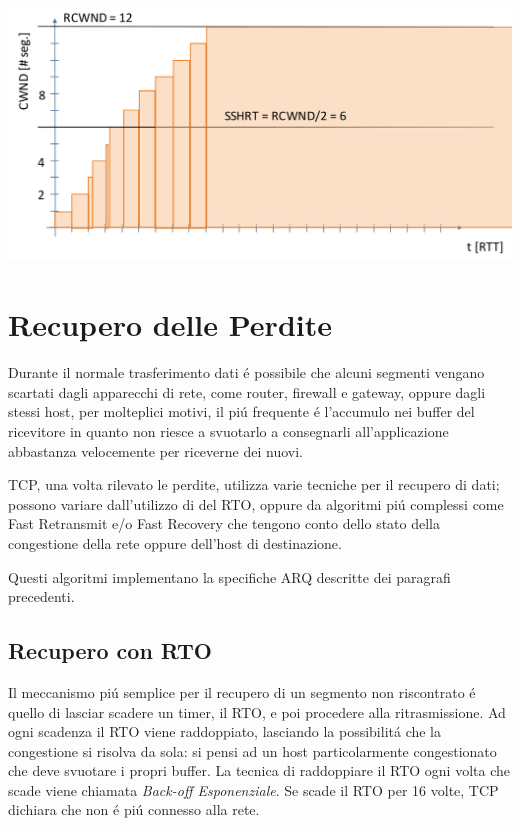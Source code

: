 \documentclass[12pt]{article}
\begin{document}
\begin{center}
	\includegraphics[scale=0.3]{livello_trasporto-img8.png}
\end{center}



\clearpage
\section{Recupero delle Perdite}\label{recupero-delle-perdite}
Durante il normale trasferimento dati \'e possibile che alcuni segmenti vengano scartati dagli apparecchi di rete, 
come router, firewall e gateway, oppure dagli stessi host, per molteplici motivi, il pi\'u frequente \'e l'accumulo 
nei buffer del ricevitore in quanto non riesce a svuotarlo a consegnarli all'applicazione abbastanza velocemente per 
riceverne dei nuovi. 

TCP, una volta rilevato le perdite, utilizza varie tecniche per il recupero di dati; possono variare dall'utilizzo di 
del RTO, oppure da algoritmi pi\'u complessi come Fast Retransmit e/o Fast Recovery che tengono conto dello stato 
della congestione della rete oppure dell'host di destinazione.

Questi algoritmi implementano la specifiche ARQ descritte dei paragrafi precedenti.

\subsection{Recupero con RTO}\label{recupero-delle-perdite-rto}
Il meccanismo pi\'u semplice per il recupero di un segmento non riscontrato \'e quello di lasciar scadere un timer, 
il RTO, e poi procedere alla ritrasmissione. Ad ogni scadenza il RTO viene raddoppiato, lasciando la possibilit\'a 
che la congestione si risolva da sola: si pensi ad un host particolarmente congestionato che deve svuotare i propri 
buffer. La tecnica di raddoppiare il RTO ogni volta che scade viene chiamata \textit{Back-off Esponenziale}. Se scade il RTO per 16 volte, TCP dichiara che non \'e pi\'u connesso alla rete.
\end{document}
